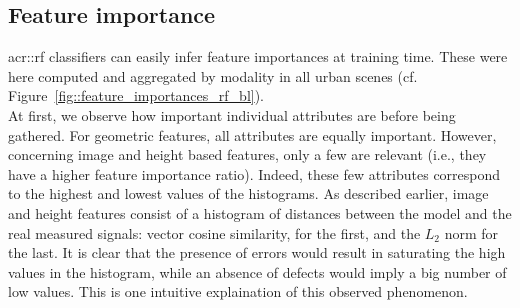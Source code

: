     \subsection{Feature importance}
        \label{subsec::experiments::baseline_feature_analysis::feature_importance}
        \begin{figure}[htb]
            \centering
        \end{figure}
        
        \gls{acr::rf} classifiers can easily infer feature importances at training time.
        These were here computed and aggregated by modality in all urban scenes (cf. Figure~\ref{fig::feature_importances_rf_bl}).\\

        At first, we observe how important individual attributes are before being gathered.
        For geometric features, all attributes are equally important.
        However, concerning image and height based features, only a few are relevant (i.e., they have a higher feature importance ratio).
        Indeed, these few attributes correspond to the highest and lowest values of the histograms.
        As described earlier, image and height features consist of a histogram of distances between the model and the real measured signals:
        vector cosine similarity, for the first, and the \(L_2\) norm for the last.
        It is clear that the presence of errors would result in saturating the high values in the histogram, while an absence of defects would imply a big number of low values.
        This is one intuitive explaination of this observed phenomenon.\\
        
